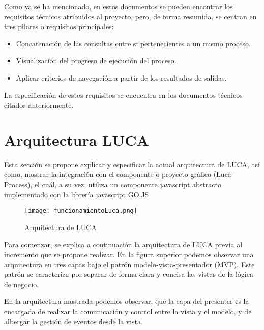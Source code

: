 \vspace{5mm}

Como ya se ha mencionado, en estos documentos se pueden encontrar los requisitos técnicos atribuidos al proyecto, pero, de forma resumida, se centran en tres pilares o requisitos principales:

\begin{itemize}
	\item  Concatenación de las consultas entre si pertenecientes a un mismo proceso.
	\item  Visualización del progreso de ejecución del proceso.
	\item Aplicar criterios de navegación a partir de los resultados de salidas.
\end{itemize}

La especificación de estos requisitos se encuentra en los documentos técnicos citados anteriormente.



\section{Arquitectura LUCA}

Esta sección se propone explicar y especificar la actual arquitectura de LUCA, así como, mostrar la integración con el componente o proyecto gráfico (Luca-Process), el cuál, a su vez, utiliza un componente javascript abstracto implementado con la librería javascript GO.JS.


\begin{figure}[H]
	\centering
	\texttt{[image: funcionamientoLuca.png]}
	\caption{Arquitectura de LUCA}\label{fig:funcionamientoLuca}
\end{figure}


Para comenzar, se explica a continuación la arquitectura de LUCA previa al incremento que se propone realizar.
En la figura superior podemos observar una arquitectura en tres capas bajo el patrón modelo-vista-presentador (MVP). Este patrón se caracteriza por separar de forma clara y concisa las vistas de la lógica de negocio.

\vspace{5mm}

En la arquitectura mostrada podemos observar, que la capa del presenter es la encargada de realizar la comunicación y control entre la vista y el modelo, y de albergar la gestión de eventos desde la vista.

\vspace{5mm}

